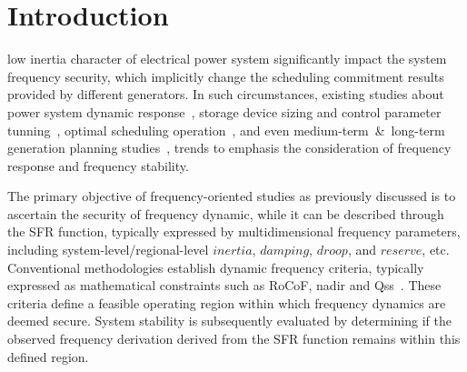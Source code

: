 \documentclass[lettersize,journal]{IEEEtran}
\begin{document}
\vspace{-0.5cm}

\section{Introduction}
 low inertia character of electrical power system significantly impact the system frequency security, which implicitly change the scheduling commitment results provided by different generators. In such circumstances, existing studies about power system dynamic response~\cite{8918440,10160138}, storage device sizing and control parameter tunning~\cite{markovic2019optimal}, optimal scheduling operation~\cite{9765359,10554988,10819485}, and even medium-term~\&~long-term generation planning studies~\cite{10820061,10938039}, trends to emphasis the consideration of frequency response and frequency stability.



The primary objective of frequency-oriented studies as previously discussed is to ascertain the security of frequency dynamic, while it can be described through the SFR function, typically expressed by multidimensional frequency parameters, including system-level/regional-level $inertia$, $damping$, $droop$, and $reserve$, etc. Conventional methodologies establish dynamic frequency criteria, typically expressed as mathematical constraints such as RoCoF, nadir and Qss~\cite{markovic2019optimal,8918440,10160138,9765359,10554988,10819485,10820061,10938039}. These criteria define a feasible operating region within which frequency dynamics are deemed secure. System stability is subsequently evaluated by determining if the observed frequency derivation derived from the SFR function remains within this defined region.
\end{document}
